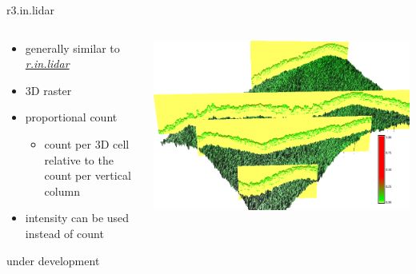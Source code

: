 \documentclass[xcolor={dvipsnames,usenames},beamer,aspectratio=169]{beamer}
\newcommand{\gmodule}[1]{\href{http://grass.osgeo.org/grass71/manuals/#1.html}{\emph{#1}}}
\begin{document}
\begin{frame}{r3.in.lidar}

\begin{columns}
\begin{column}{0.28\textwidth}

\begin{itemize}
  \item generally similar to \gmodule{r.in.lidar}
  \item 3D raster
  \item proportional count
  \begin{itemize}
    \item count per 3D cell relative to the count per vertical column
  \end{itemize}
  \item intensity can be used instead of count
\end{itemize}

\bigskip
\footnotesize
under development

\end{column}
\begin{column}{0.7\textwidth}

\begin{center}
  \includegraphics[width=\textwidth]{grass/red_green_3d}
\end{center}

\end{column}
\end{columns}

\end{frame}

\end{document}
